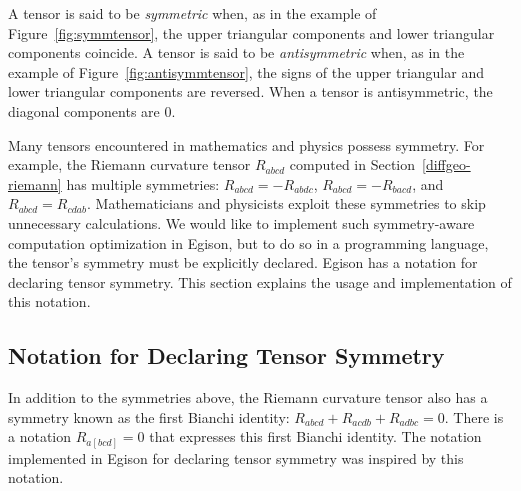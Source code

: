 A tensor is said to be \emph{symmetric} when, as in the example of Figure~\ref{fig:symmtensor}, the upper triangular components and lower triangular components coincide.
A tensor is said to be \emph{antisymmetric} when, as in the example of Figure~\ref{fig:antisymmtensor}, the signs of the upper triangular and lower triangular components are reversed.
When a tensor is antisymmetric, the diagonal components are 0.

Many tensors encountered in mathematics and physics possess symmetry.
For example, the Riemann curvature tensor $R_{abcd}$ computed in Section~\ref{diffgeo-riemann} has multiple symmetries: $R_{abcd} = -R_{abdc}$, $R_{abcd} = -R_{bacd}$, and $R_{abcd} = R_{cdab}$.
Mathematicians and physicists exploit these symmetries to skip unnecessary calculations.
We would like to implement such symmetry-aware computation optimization in Egison, but to do so in a programming language, the tensor's symmetry must be explicitly declared.
Egison has a notation for declaring tensor symmetry.
This section explains the usage and implementation of this notation.

\subsection{Notation for Declaring Tensor Symmetry}

In addition to the symmetries above, the Riemann curvature tensor also has a symmetry known as the first Bianchi identity: $R_{abcd} + R_{acdb} + R_{adbc} = 0$.
There is a notation $R_{a[bcd]} = 0$ that expresses this first Bianchi identity.
The notation implemented in Egison for declaring tensor symmetry was inspired by this notation.

